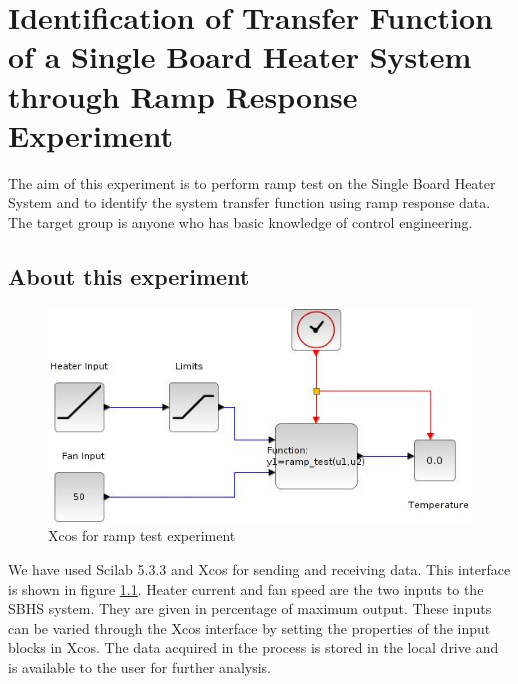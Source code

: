\chapter{Identification of Transfer Function of a Single Board Heater System through Ramp Response Experiment}\label{chap2}
The aim of this experiment is to perform ramp test on the Single Board Heater System and to identify the 
system transfer function using ramp response data. The target group is anyone who has basic knowledge of control engineering.
\section{About this experiment}

\begin{figure}
\centering
\includegraphics[width=0.7\linewidth]{Ramp-test_manual/ramp_test.jpg}
\caption{Xcos for ramp test experiment}
\label{Xcos_rt}
\end{figure} 
We have used Scilab 5.3.3 and Xcos for sending and receiving data. This interface is shown in figure \ref{Xcos_rt}. 
Heater current and fan speed are the two inputs to the SBHS system. They are given in percentage of maximum output. 
These inputs can be varied through the Xcos interface by setting the properties of the input blocks in Xcos. 
The data acquired in the process is stored in the local drive and is available to the user for further analysis.
